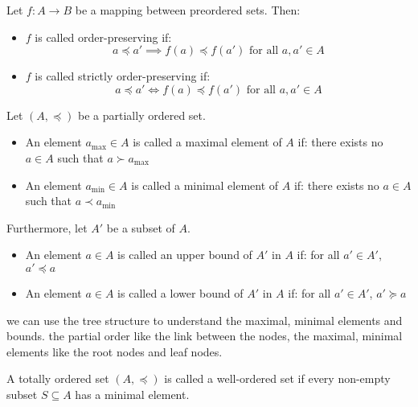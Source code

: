 \begin{definition}
  Let $f : A \to B$ be a mapping between preordered sets. Then:
  \begin{itemize}
    \item $f$ is called order-preserving if:
      \[
        a \preceq a' \implies f(a) \preceq f(a') \text{ for all } a,a' \in A
      \]

    \item $f$ is called strictly order-preserving if:
      \[
        a \preceq a' \iff f(a) \preceq f(a') \text{ for all } a,a' \in A
      \]
  \end{itemize}
\end{definition}

\begin{definition}
  Let $(A,\preceq)$ be a partially ordered set.
  \begin{itemize}
    \item An element $a_{\max} \in A$ is called a maximal element of $A$ if: there exists no $a \in A$ such that $a \succ a_{\max}$

    \item An element $a_{\min} \in A$ is called a minimal element of $A$ if: there exists no $a \in A$ such that $a \prec a_{\min}$
  \end{itemize}

  Furthermore, let $A'$ be a subset of $A$.
  \begin{itemize}
    \item An element $a \in A$ is called an upper bound of $A'$ in $A$ if: for all $a' \in A'$, $a' \preceq a$

    \item An element $a \in A$ is called a lower bound of $A'$ in $A$ if: for all $a' \in A'$, $a' \succeq a$
  \end{itemize}
\end{definition}

\begin{remark}
  we can use the tree structure to understand the maximal, minimal elements and bounds. the partial order like the link between the nodes, the maximal, minimal elements like the root nodes and leaf nodes.
\end{remark}

\begin{definition}
  A totally ordered set $(A,\preceq)$ is called a well-ordered set if every non-empty subset $S \subseteq A$ has a minimal element.
\end{definition}

